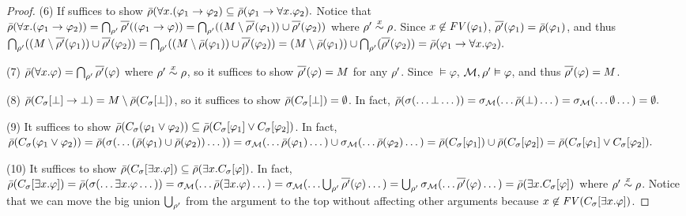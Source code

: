 \documentclass{amsart}
\begin{document}
\begin{proof}
	(6)
	If suffices to show
	$\bar{\rho}(\forall x . (\varphi_1 \to \varphi_2)
	\subseteq
	\bar{\rho}(\varphi_1 \to \forall x . \varphi_2).
	$
	Notice that
	$\bar{\rho}(\forall x . (\varphi_1 \to \varphi_2))
	= \bigcap_{\rho'}\overline{\rho'}((\varphi_1 \to \varphi))
	= \bigcap_{\rho'}((M \setminus \overline{\rho'}(\varphi_1)) \cup 
	\overline{\rho'}(\varphi_2))
	$
	where $\rho' \overset{x}{\sim} \rho$.
	Since $x \not\in \mathit{FV}(\varphi_1)$,
	$\overline{\rho'}(\varphi_1) = \bar{\rho}(\varphi_1)$,
	and thus
	$\bigcap_{\rho'}((M \setminus \overline{\rho'}(\varphi_1)) \cup \overline{\rho'}(\varphi_2))
	= \bigcap_{\rho'}((M \setminus \bar{\rho}(\varphi_1)) \cup \overline{\rho'}(\varphi_2))
	= (M \setminus \bar{\rho}(\varphi_1)) \cup \bigcap_{\rho'}(\overline{\rho'}(\varphi_2))
	= \bar{\rho}(\varphi_1 \to \forall x . \varphi_2).
	$
	
	
	
	(7)
	$\bar{\rho}(\forall x . \varphi)
	= \bigcap_{\rho'} \overline{\rho'}(\varphi)
	$
	where $\rho' \overset{x}{\sim} \rho$,
	so it suffices to show $\overline{\rho'}(\varphi) = M$ for any $\rho'$.
	Since $\vDash \varphi$, $\mathcal{M},\rho' \vDash \varphi$, and thus
	$\overline{\rho'}(\varphi) = M$.
	
	
	(8)
	$\bar{\rho}(C_{\sigma}[\bot] \to \bot)
	= M \setminus \bar{\rho}(C_{\sigma}[\bot])
	$,
	so it suffices to show $\bar{\rho}(C_{\sigma}[\bot]) = \emptyset$.
	In fact,
	$\bar{\rho}(\sigma(\dots \bot \dots))
	= {\sigma_{\mathcal{M}}}(\dots \bar{\rho}(\bot) \dots)
	= {\sigma_{\mathcal{M}}}(\dots \emptyset \dots)
	= \emptyset.
	$
	
	(9)
	It suffices to show
	$\bar{\rho}(C_{\sigma}(\varphi_1 \vee \varphi_2))
	\subseteq
	\bar{\rho}(C_{\sigma}[ \varphi_1 ]
	\vee
	C_{\sigma}[ \varphi_2 ])$.
	In fact,
	$\bar{\rho}(C_{\sigma}(\varphi_1 \vee \varphi_2))
	= \bar{\rho}(\sigma(\dots (\bar{\rho}(\varphi_1) \cup \bar{\rho}(\varphi_2)) \dots))
	= {\sigma_{\mathcal{M}}}(\dots \bar{\rho}(\varphi_1) \dots)
	\cup
	{\sigma_{\mathcal{M}}}(\dots \bar{\rho}(\varphi_2) \dots)
	= \bar{\rho}(C_{\sigma}[ \varphi_1 ])
	\cup
	\bar{\rho}(C_{\sigma}[ \varphi_2 ])
	= \bar{\rho}(C_{\sigma}[ \varphi_1 ]
	\vee
	C_{\sigma}[ \varphi_2 ]).
	$
	
	(10)
	It suffices to show
	$\bar{\rho}(C_{\sigma}[\exists x . \varphi])
	\subseteq
	\bar{\rho}(\exists x . C_{\sigma}[\varphi])$.
	In fact,
	$
	\bar{\rho}(C_{\sigma}[\exists x . \varphi])
	= \bar{\rho}(\sigma(\dots \exists x . \varphi \dots))
	= {\sigma_{\mathcal{M}}}(\dots \bar{\rho}(\exists x. \varphi) \dots)
	= {\sigma_{\mathcal{M}}}(\ldots \bigcup_{\rho'}\overline{\rho'}(\varphi) \dots)
	= \bigcup_{\rho'} {\sigma_{\mathcal{M}}}(\dots \overline{\rho'}(\varphi) \dots)
	= \bar{\rho}(\exists x . C_{\sigma}[\varphi])
	$
	where $\rho' \overset{x}{\sim} \rho$.
	Notice that we can move the big union $\bigcup_{\rho'}$ from the argument
	to the top without affecting other arguments because
	$x \not\in \mathit{FV}(C_{\sigma}[\exists x . \varphi])$.
	

\end{proof}
\end{document}
